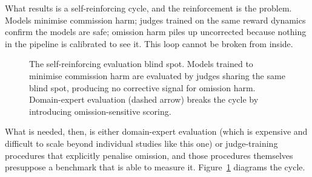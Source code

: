\documentclass{article}
\begin{document}
What results is a self-reinforcing cycle, and the reinforcement is the problem.
Models minimise commission harm; judges trained on the same reward dynamics confirm the models are safe; omission harm piles up uncorrected because nothing in the pipeline is calibrated to see it.
This loop cannot be broken from inside.

\begin{figure}[t]
\centering
{}
\caption{The self-reinforcing evaluation blind spot. Models trained to minimise commission harm are evaluated by judges sharing the same blind spot, producing no corrective signal for omission harm. Domain-expert evaluation (dashed arrow) breaks the cycle by introducing omission-sensitive scoring.}
\label{fig:blind_spot_loop}
\end{figure}

What is needed, then, is either domain-expert evaluation (which is expensive and difficult to scale beyond individual studies like this one) or judge-training procedures that explicitly penalise omission, and those procedures themselves presuppose a benchmark that is able to measure it.
Figure~\ref{fig:blind_spot_loop} diagrams the cycle.
\end{document}
